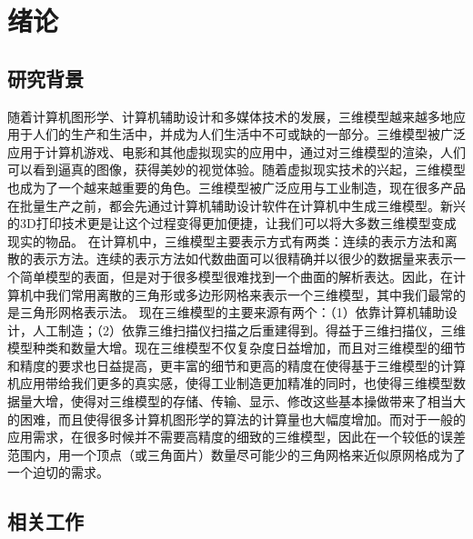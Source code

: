 

\chapter{绪论}

\section{研究背景}
随着计算机图形学、计算机辅助设计和多媒体技术的发展，三维模型越来越多地应用于人们的生产和生活中，并成为人们生活中不可或缺的一部分。三维模型被广泛应用于计算机游戏、电影和其他虚拟现实的应用中，通过对三维模型的渲染，人们可以看到逼真的图像，获得美妙的视觉体验。随着虚拟现实技术的兴起，三维模型也成为了一个越来越重要的角色。三维模型被广泛应用与工业制造，现在很多产品在批量生产之前，都会先通过计算机辅助设计软件在计算机中生成三维模型。新兴的3D打印技术更是让这个过程变得更加便捷，让我们可以将大多数三维模型变成现实的物品。
在计算机中，三维模型主要表示方式有两类：连续的表示方法和离散的表示方法。连续的表示方法如代数曲面可以很精确并以很少的数据量来表示一个简单模型的表面，但是对于很多模型很难找到一个曲面的解析表达。因此，在计算机中我们常用离散的三角形或多边形网格来表示一个三维模型，其中我们最常的是三角形网格表示法。
现在三维模型的主要来源有两个：（1）依靠计算机辅助设计，人工制造；（2）依靠三维扫描仪扫描之后重建得到。得益于三维扫描仪，三维模型种类和数量大增。现在三维模型不仅复杂度日益增加，而且对三维模型的细节和精度的要求也日益提高，更丰富的细节和更高的精度在使得基于三维模型的计算机应用带给我们更多的真实感，使得工业制造更加精准的同时，也使得三维模型数据量大增，使得对三维模型的存储、传输、显示、修改这些基本操做带来了相当大的困难，而且使得很多计算机图形学的算法的计算量也大幅度增加。而对于一般的应用需求，在很多时候并不需要高精度的细致的三维模型，因此在一个较低的误差范围内，用一个顶点（或三角面片）数量尽可能少的三角网格来近似原网格成为了一个迫切的需求。


\section{相关工作}

